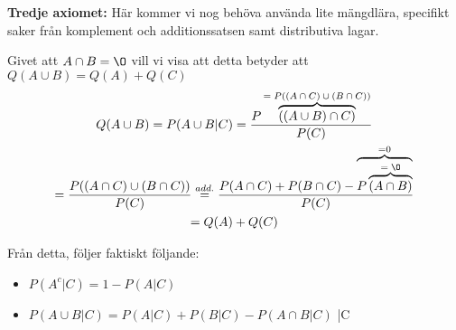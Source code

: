 \par\bigskip
\noindent\textbf{Tredje axiomet:} Här kommer vi nog behöva använda lite mängdlära, specifikt saker från komplement och additionssatsen samt distributiva lagar.\par
\noindent Givet att $A\cap B=\O$ vill vi visa att detta betyder att $Q(A\cup B) = Q(A)+Q(C)$ 
\begin{equation*}
  \begin{gathered}
    Q(A\cup B) = P(A\cup B|C)= \dfrac{P\overbrace{((A\cup B)\cap C)}^{\text{$=P((A\cap C)\cup(B\cap C))$}}}{P(C)}\\
    =\dfrac{P((A\cap C)\cup(B\cap C))}{P(C)}\stackrel{add.}{=}\dfrac{P(A\cap C)+P(B\cap C)-\overbrace{P\overbrace{(A\cap B)}^{\text{$=\O$}}}^{\text{=0}}}{P(C)}\\
    = Q(A)+Q(C)
  \end{gathered}
\end{equation*}
\par\bigskip
\noindent Från detta, följer faktiskt följande:
\begin{itemize}
  \item $P(A^c|C) = 1-P(A|C)$
  \item $P(A\cup B|C) = P(A|C)+P(B|C)-P(A\cap B|C)$
|C\end{itemize}

